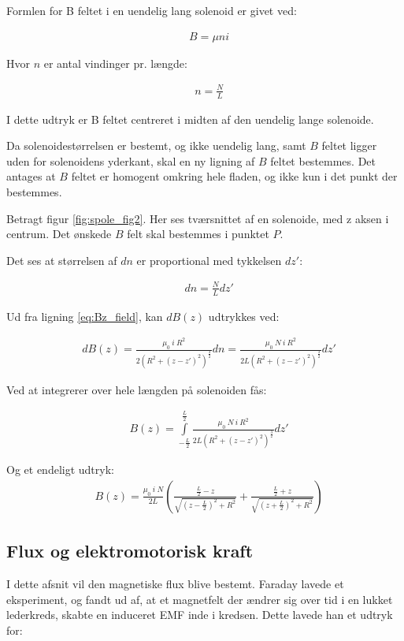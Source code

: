 Formlen for B feltet i en uendelig lang solenoid er givet ved:

\begin{align}
	&B=\mu ni
\end{align}

Hvor $n$ er antal vindinger pr. længde:


\begin{align}
	&n=\frac{N}{L}
\end{align}

I dette udtryk er B feltet centreret i midten af den uendelig lange solenoide.

Da solenoidestørrelsen er bestemt, og ikke uendelig lang, samt $B$ feltet ligger uden for solenoidens yderkant, skal en ny ligning af $B$ feltet bestemmes.
Det antages at $B$ feltet er homogent omkring hele fladen, og ikke kun i det punkt der bestemmes.


Betragt figur \ref{fig:spole_fig2}. Her ses tværsnittet af en solenoide, med z aksen i centrum. Det ønskede $B$ felt skal bestemmes i punktet $P$.

Det ses at størrelsen af $dn$ er proportional med tykkelsen $dz'$:

\begin{align}
	&dn=\frac{N}{L} dz'
\end{align}



Ud fra ligning \ref{eq:Bz_field}, kan $dB(z)$ udtrykkes ved: 

\begin{align}
	&dB(z)=\frac{\mu_0 \: i \: R^2}{2(R^2+(z-z')^2)^\frac{3}{2}}dn=\frac{\mu_0 \: N \: i \: R^2}{2L(R^2+(z-z')^2)^\frac{3}{2}}dz'
\end{align}

Ved at integrerer over hele længden på solenoiden fås:

\begin{align}
	&B(z)=\int\limits_{-\frac{L}{2}}^{\frac{L}{2}}\frac{\mu_0 \: N \: i \: R^2}{2L(R^2+(z-z')^2)^\frac{3}{2}}dz'
\end{align}

Og et endeligt udtryk:
\begin{align}
	&B(z)= \frac{\mu_0 \: i \: N}{2L}\left(\frac{\frac{L}{2}-z}{\sqrt{(z-\frac{L}{2})^2+R^2}}+\frac{\frac{L}{2}+z}{\sqrt{(z+\frac{L}{2})^2+R^2}}\right) \label{eq:B_field2}
\end{align}

\subsection{Flux og elektromotorisk kraft}
I dette afsnit vil den magnetiske flux blive bestemt.  
Faraday lavede et eksperiment, og fandt ud af, at et magnetfelt der ændrer sig over tid i en lukket lederkreds, skabte en induceret EMF inde i kredsen.
Dette lavede han et udtryk for:

